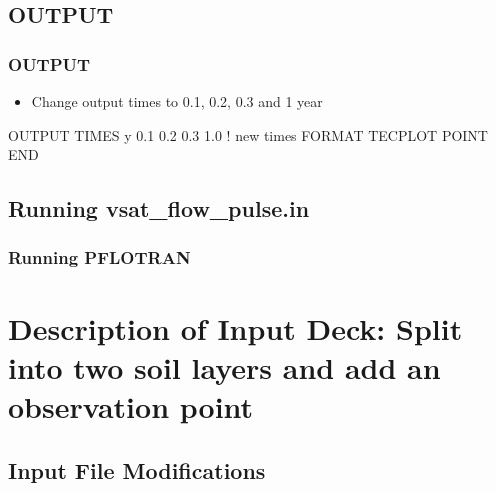 \documentclass{beamer}
\newcommand\bluecomment[1]{{{\color{blue} #1}}}
\newcommand\magentacomment[1]{{{\color{magenta} #1}}}
\begin{document}
\subsection{OUTPUT}

\begin{frame}[fragile]\frametitle{OUTPUT}

\begin{itemize}
\item Change output times to 0.1, 0.2, 0.3 and 1 year
\end{itemize}


\begin{semiverbatim}

OUTPUT
  TIMES y \magentacomment{0.1 0.2 0.3 1.0}     \bluecomment{! new times}
  FORMAT TECPLOT POINT
END

\end{semiverbatim}

\end{frame}

\subsection{Running vsat_flow_pulse.in}

\begin{frame}[fragile]\frametitle{Running PFLOTRAN}


\end{frame}

\section{Description of Input Deck: Split into two soil layers and add an observation point}

\subsection{Input File Modifications}
\end{document}
